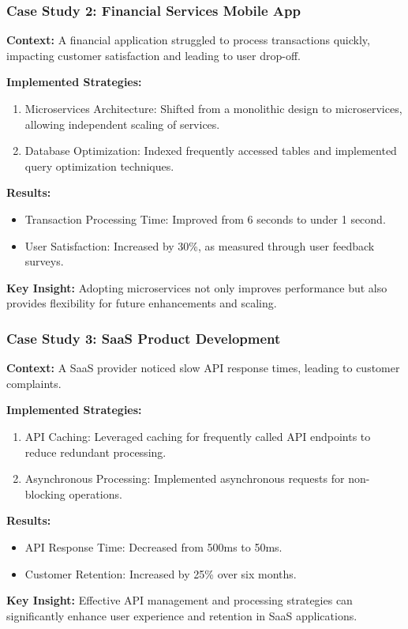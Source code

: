 \documentclass[aspectratio=169]{beamer}
\begin{document}
\begin{frame}[fragile]
    \frametitle{Case Study 2: Financial Services Mobile App}
    \textbf{Context:} A financial application struggled to process transactions quickly, impacting customer satisfaction and leading to user drop-off.
    
    \textbf{Implemented Strategies:}
    \begin{enumerate}
        \item Microservices Architecture: Shifted from a monolithic design to microservices, allowing independent scaling of services.
        \item Database Optimization: Indexed frequently accessed tables and implemented query optimization techniques.
    \end{enumerate}
    
    \textbf{Results:}
    \begin{itemize}
        \item Transaction Processing Time: Improved from 6 seconds to under 1 second.
        \item User Satisfaction: Increased by 30\%, as measured through user feedback surveys.
    \end{itemize}
    
    \textbf{Key Insight:} Adopting microservices not only improves performance but also provides flexibility for future enhancements and scaling.
\end{frame}

\begin{frame}[fragile]
    \frametitle{Case Study 3: SaaS Product Development}
    \textbf{Context:} A SaaS provider noticed slow API response times, leading to customer complaints.
    
    \textbf{Implemented Strategies:}
    \begin{enumerate}
        \item API Caching: Leveraged caching for frequently called API endpoints to reduce redundant processing.
        \item Asynchronous Processing: Implemented asynchronous requests for non-blocking operations.
    \end{enumerate}
    
    \textbf{Results:}
    \begin{itemize}
        \item API Response Time: Decreased from 500ms to 50ms.
        \item Customer Retention: Increased by 25\% over six months.
    \end{itemize}
    
    \textbf{Key Insight:} Effective API management and processing strategies can significantly enhance user experience and retention in SaaS applications.
\end{frame}
\end{document}
